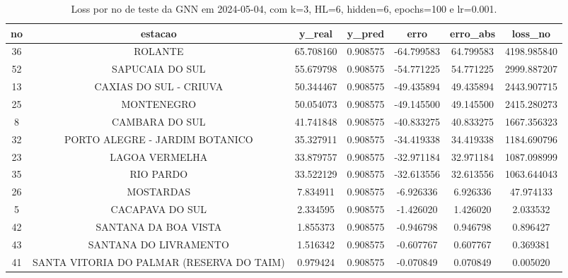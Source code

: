 \begin{table}[h]
\centering
\caption{Loss por no de teste da GNN em 2024-05-04, com k=3, HL=6, hidden=6, epochs=100 e lr=0.001.}
\label{tab:gnn_loss_k3_hl6_h6_e100_d20240504}
\begin{tabular}{ccccccc}
\toprule
no & estacao & y\_real & y\_pred & erro & erro\_abs & loss\_no \\
\midrule
36 & ROLANTE & 65.708160 & 0.908575 & -64.799583 & 64.799583 & 4198.985840 \\
52 & SAPUCAIA DO SUL & 55.679798 & 0.908575 & -54.771225 & 54.771225 & 2999.887207 \\
13 & CAXIAS DO SUL - CRIUVA & 50.344467 & 0.908575 & -49.435894 & 49.435894 & 2443.907715 \\
25 & MONTENEGRO & 50.054073 & 0.908575 & -49.145500 & 49.145500 & 2415.280273 \\
8 & CAMBARA DO SUL & 41.741848 & 0.908575 & -40.833275 & 40.833275 & 1667.356323 \\
32 & PORTO ALEGRE - JARDIM BOTANICO & 35.327911 & 0.908575 & -34.419338 & 34.419338 & 1184.690796 \\
23 & LAGOA VERMELHA & 33.879757 & 0.908575 & -32.971184 & 32.971184 & 1087.098999 \\
35 & RIO PARDO & 33.522129 & 0.908575 & -32.613556 & 32.613556 & 1063.644043 \\
26 & MOSTARDAS & 7.834911 & 0.908575 & -6.926336 & 6.926336 & 47.974133 \\
5 & CACAPAVA DO SUL & 2.334595 & 0.908575 & -1.426020 & 1.426020 & 2.033532 \\
42 & SANTANA DA BOA VISTA & 1.855373 & 0.908575 & -0.946798 & 0.946798 & 0.896427 \\
43 & SANTANA DO LIVRAMENTO & 1.516342 & 0.908575 & -0.607767 & 0.607767 & 0.369381 \\
41 & SANTA VITORIA DO PALMAR (RESERVA DO TAIM) & 0.979424 & 0.908575 & -0.070849 & 0.070849 & 0.005020 \\
\bottomrule
\end{tabular}
\end{table}

